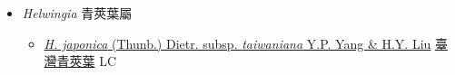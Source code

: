 
  \begin{itemize}
 \item[] \textit{Helwingia} 青莢葉屬
                    
  \begin{itemize}
        \item[] \href{http://www.theplantlist.org/tpl1.1/search?q=Helwingia+japonica+subsp.+taiwaniana}{\textit{H. japonica} (Thunb.) Dietr. subsp. \textit{taiwaniana} Y.P. Yang \& H.Y. Liu}     \href{\detokenize{http://taibnet.sinica.edu.tw/chi/taibnet_species_list.php?T2=臺灣青莢葉&T2_new_value=true&fr=y}}{臺灣青莢葉} LC
  \end{itemize}
  \end{itemize}
